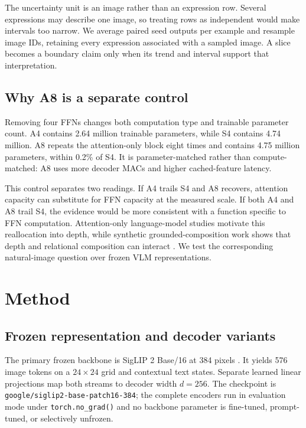 \documentclass[conference]{IEEEtran}
\begin{document}
The uncertainty unit is an image rather than an expression row. Several expressions may describe one image, so treating rows as independent would make intervals too narrow. We average paired seed outputs per example and resample image IDs, retaining every expression associated with a sampled image. A slice becomes a boundary claim only when its trend and interval support that interpretation.

\subsection{Why A8 is a separate control}
Removing four FFNs changes both computation type and trainable parameter count. A4 contains 2.64 million trainable parameters, while S4 contains 4.74 million. A8 repeats the attention-only block eight times and contains 4.75 million parameters, within 0.2\% of S4. It is parameter-matched rather than compute-matched: A8 uses more decoder MACs and higher cached-feature latency.

This control separates two readings. If A4 trails S4 and A8 recovers, attention capacity can substitute for FFN capacity at the measured scale. If both A4 and A8 trail S4, the evidence would be more consistent with a function specific to FFN computation. Attention-only language-model studies motivate this reallocation into depth, while synthetic grounded-composition work shows that depth and relational composition can interact \cite{ndubuaku2026attention,sikarwar2022groundcompose}. We test the corresponding natural-image question over frozen VLM representations.

\section{Method}
\subsection{Frozen representation and decoder variants}
The primary frozen backbone is SigLIP 2 Base/16 at 384 pixels \cite{tschannen2025siglip2}. It yields 576 image tokens on a $24\times24$ grid and contextual text states. Separate learned linear projections map both streams to decoder width $d=256$. The checkpoint is \texttt{google/siglip2-base-patch16-384}; the complete encoders run in evaluation mode under \texttt{torch.no\_grad()} and no backbone parameter is fine-tuned, prompt-tuned, or selectively unfrozen.
\end{document}
